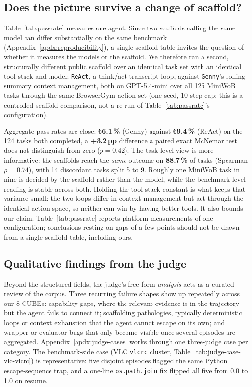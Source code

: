 \documentclass{article}
\newcommand{\NUMEXP}{8}               %
\begin{document}
\subsection{Does the picture survive a change of scaffold?}
\label{sec:exp-scaffold}

Table~\ref{tab:passrate} measures one agent. Since two scaffolds calling the
same model can differ substantially on the same benchmark
(Appendix~\ref{apdx:reproducibility}), a single-scaffold table invites the
question of whether it measures the models or the scaffold. We therefore ran a
second, structurally different public scaffold over an identical task set with
an identical tool stack and model: \texttt{ReAct}, a think/act transcript loop,
against \texttt{Genny}'s rolling-summary context management, both on
GPT-5.4-mini over all 125 MiniWoB tasks through the same BrowserGym action set
(one seed, 10-step cap; this is a controlled scaffold comparison, not a
re-run of Table~\ref{tab:passrate}'s configuration).

Aggregate pass rates are close: \textbf{66.1\,\%} (Genny) against
\textbf{69.4\,\%} (ReAct) on the 124 tasks both completed, a \textbf{+3.2\,pp}
difference a paired exact McNemar test does not distinguish from zero
($p{=}0.42$). The task-level view is more informative: the scaffolds reach the
\emph{same} outcome on \textbf{88.7\,\%} of tasks (Spearman $\rho{=}0.74$),
with 14 discordant tasks split 5 to 9. Roughly one MiniWoB task in nine is
decided by the scaffold rather than the model, while the benchmark-level
reading is stable across both. Holding the tool stack constant is what keeps
that variance small: the two loops differ in context management but act through
the identical action space, so neither can win by having better tools. It also
bounds our claim. Table~\ref{tab:passrate} reports platform measurements of one
configuration; conclusions resting on gaps of a few points should not be drawn
from a single-scaffold table, including ours.

\subsection{Qualitative findings from the judge}
\label{sec:exp-qualitative}

Beyond the structured fields, the judge's free-form \emph{analysis}
acts as a curated review of the corpus. Three recurring failure
shapes show up repeatedly across our \NUMEXP{} CUBEs: capability
gaps, where the relevant evidence is in the trajectory but the agent
fails to connect it; scaffolding pathologies, typically deterministic
loops or context exhaustion that the agent cannot escape on its own;
and wrapper or evaluator bugs that only become visible once several
episodes are aggregated. Appendix~\ref{apdx:judge-cases} works
through one three-judge case per category. The benchmark-side case
(VLC \texttt{vlcrc} cluster, Table~\ref{tab:judge-case-vlc-vlcrc}) is
representative: five disjoint episodes flagged the same Python
escape-sequence trap, and a one-line \texttt{os.path.join} fix
flipped all five from 0.0 to 1.0 on resume.
\end{document}

